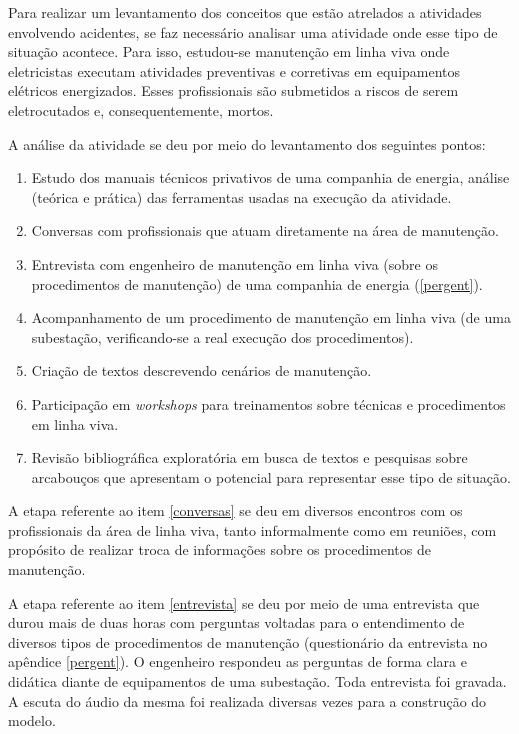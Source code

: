 Para realizar um levantamento dos conceitos que estão atrelados a atividades envolvendo acidentes, se faz necessário analisar uma atividade onde esse tipo de situação acontece. Para isso, estudou-se manutenção em linha viva onde eletricistas executam atividades preventivas e corretivas em equipamentos elétricos energizados. Esses profissionais são submetidos a riscos de serem eletrocutados e, consequentemente, mortos. 

A análise da atividade se deu por meio do levantamento dos seguintes pontos: 
\begin{enumerate}
	\item Estudo dos manuais técnicos privativos de uma companhia de energia, análise (teórica e prática) das ferramentas usadas na execução da atividade. \label{estudosprivativos}
	\item Conversas com profissionais que atuam diretamente na área de manutenção. \label{conversas}
	\item Entrevista com engenheiro de manutenção em linha viva (sobre os procedimentos de manutenção) de uma companhia de energia (\ref{pergent}). \label{entrevista}
	\item Acompanhamento de um procedimento de manutenção em linha viva (de uma subestação, verificando-se a real execução dos procedimentos). \label{inloco}
	\item Criação de textos descrevendo cenários de manutenção.
	\item Participação em \textit{workshops} para treinamentos sobre técnicas e procedimentos em linha viva.
	\item Revisão bibliográfica exploratória em busca de textos e pesquisas sobre arcabouços que apresentam o potencial para representar esse tipo de situação. \label{revisaoexploratoria}
\end{enumerate}

A etapa referente ao item \ref{conversas} se deu em diversos encontros com os profissionais da área de linha viva, tanto informalmente como em reuniões, com propósito de realizar troca de informações sobre os procedimentos de manutenção. 

A etapa referente ao item \ref{entrevista} se deu por meio de uma entrevista que durou mais de duas horas com perguntas voltadas para o entendimento de diversos tipos de procedimentos de manutenção (questionário da entrevista no apêndice \ref{pergent}). O engenheiro respondeu as perguntas de forma clara e didática diante de equipamentos de uma subestação. Toda entrevista foi gravada. A escuta do áudio da mesma foi realizada diversas vezes para a construção do modelo.  

